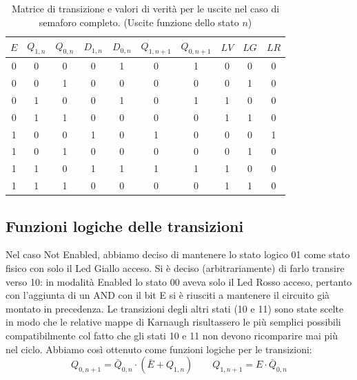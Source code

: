 \documentclass[10pt,a4paper]{article}
\begin{document}
\begin{table}
\centering
\begin{tabular}{|c||c|c|c|c||c|c||c|c|c|}
\hline
$E$ & $Q_{1,n}$ & $Q_{0, n}$ & $D_{1,n}$ & $D_{0,n}$ & $Q_{1, n+1}$ & $Q_{0, n+1}$ & $LV$ & $LG$ & $LR$\\
\hline
0 & 0 & 0 & 0 & 1 & 0 & 1 & 0 & 0 & 0 \\
0 & 0 & 1 & 0 & 0 & 0 & 0 & 0 & 1 & 0\\
0 & 1 & 0 & 0 & 1 & 0 & 1 & 1 & 0 & 0\\
0 & 1 & 1 & 0 & 0 & 0 & 0 & 1 & 1 & 0\\
\hline
1 & 0 & 0 & 1 & 0 & 1 & 0 & 0 & 0 & 1 \\
1 & 0 & 1 & 0 & 0 & 0 & 0 & 0 & 1 & 0\\
1 & 1 & 0 & 1 & 1 & 1 & 1 & 1 & 0 & 0\\
1 & 1 & 1 & 0 & 0 & 0 & 0 & 1 & 1 & 0\\
\hline
\end{tabular}
\caption{Matrice di transizione e valori di verità per le uscite nel caso di semaforo completo. (Uscite funzione dello stato $n$) \label{tab:semaforocompleto}}
\end{table} 


\subsection{Funzioni logiche delle transizioni}
Nel caso Not Enabled, abbiamo deciso di mantenere lo stato logico 01 come stato fisico con solo il Led Giallo acceso. Si è deciso (arbitrariamente) di farlo transire verso 10: in modalità Enabled lo stato 00 aveva solo il Led Rosso acceso, pertanto con l'aggiunta di un AND con il bit E si è riusciti a mantenere il circuito già montato in precedenza. Le transizioni degli altri stati (10 e 11) sono state scelte in modo che le relative mappe di Karnaugh risultassero le più semplici possibili compatibilmente col fatto che gli stati 10 e 11 non devono ricomparire mai più nel ciclo.
Abbiamo così ottenuto come funzioni logiche per le transizioni:
\begin{equation}
Q_{0, n+1} = \bar{Q}_{0,n}\cdot(\bar{E}+Q_{1,n})\qquad
Q_{1, n+1} = E\cdot \bar{Q}_{0, n}
\end{equation}
\end{document}
